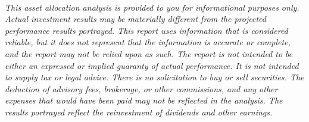 \documentclass{article}
\begin{document}
\begin{center}
{\scshape\Large\bfseries \, \par}
	\vspace{18.5cm}
	\footnotesize
\emph{This asset allocation analysis is provided to you for informational purposes only. Actual investment results may be materially different from the projected performance results portrayed. This report uses information that is considered reliable, but it does not represent that the information is accurate or complete, and the report may not be relied upon as such. The report is not intended to be either an expressed or implied guaranty of actual performance. It is not intended to supply tax or legal advice. There is no solicitation to buy or sell securities. The deduction of advisory fees, brokerage, or other commissions, and any other expenses that would have been paid may not be reflected in the analysis. The results portrayed reflect the reinvestment of dividends and other earnings.}

\end{center}
\end{document}
